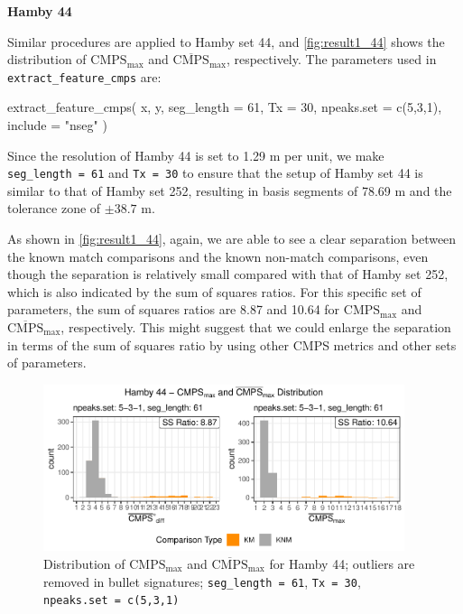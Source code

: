 \textbf{Hamby 44}

Similar procedures are applied to Hamby set 44, and
\autoref{fig:result1_44} shows the distribution of
\(\mathrm{CMPS_{max}}\) and \(\mathrm{\overline{CMPS}_{max}}\),
respectively. The parameters used in \texttt{extract\_feature\_cmps}
are:

\begin{Schunk}
\begin{Sinput}
extract_feature_cmps(
  x, y,
  seg_length = 61, 
  Tx = 30,
  npeaks.set = c(5,3,1),
  include = "nseg"
)
\end{Sinput}
\end{Schunk}

Since the resolution of Hamby 44 is set to 1.29 \textmu m per unit, we
make \texttt{seg\_length\ =\ 61} and \texttt{Tx\ =\ 30} to ensure that
the setup of Hamby set 44 is similar to that of Hamby set 252, resulting
in basis segments of 78.69 \textmu m and the tolerance zone of
\(\pm 38.7\) \textmu m.

As shown in \autoref{fig:result1_44}, again, we are able to see a clear
separation between the known match comparisons and the known non-match
comparisons, even though the separation is relatively small compared
with that of Hamby set 252, which is also indicated by the sum of
squares ratios. For this specific set of parameters, the sum of squares
ratios are 8.87 and 10.64 for \(\mathrm{CMPS_{max}}\) and
\(\mathrm{\overline{CMPS}_{max}}\), respectively. This might suggest
that we could enlarge the separation in terms of the sum of squares
ratio by using other CMPS metrics and other sets of parameters.

\begin{Schunk}
\begin{figure}

{\centering \includegraphics[width=400px]{ju-hofmann_files/figure-latex/result1_44-1} 

}

\caption{Distribution of $\mathrm{CMPS_{max}}$ and $\mathrm{\overline{CMPS}_{max}}$ for Hamby 44; outliers are removed in bullet signatures; \texttt{seg\_length = 61}, \texttt{Tx = 30}, \texttt{npeaks.set = c(5,3,1)} }\label{fig:result1_44}
\end{figure}
\end{Schunk}

